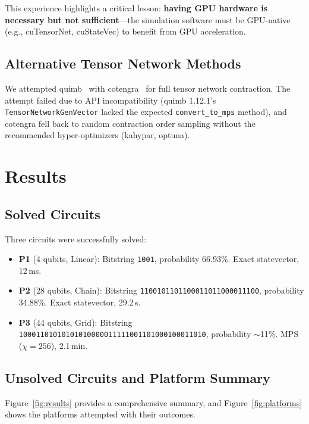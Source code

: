 \documentclass[11pt,a4paper]{article}
\newcommand{\bd}{\chi}
\begin{document}
This experience highlights a critical lesson: \textbf{having GPU hardware is necessary but not sufficient}---the simulation software must be GPU-native (e.g., cuTensorNet, cuStateVec) to benefit from GPU acceleration.

\subsection{Alternative Tensor Network Methods}
\label{sec:quimb}

We attempted quimb~\cite{gray2018quimb} with cotengra~\cite{gray2021hyper} for full tensor network contraction. The attempt failed due to API incompatibility (quimb 1.12.1's \texttt{TensorNetworkGenVector} lacked the expected \texttt{convert\_to\_mps} method), and cotengra fell back to random contraction order sampling without the recommended hyper-optimizers (kahypar, optuna).

\section{Results}
\label{sec:results}

\subsection{Solved Circuits}

Three circuits were successfully solved:
\begin{itemize}[nosep]
    \item \textbf{P1} (4 qubits, Linear): Bitstring \texttt{1001}, probability 66.93\%. Exact statevector, 12\,ms.
    \item \textbf{P2} (28 qubits, Chain): Bitstring \texttt{1100101101100011011000011100}, probability 34.88\%. Exact statevector, 29.2\,s.
    \item \textbf{P3} (44 qubits, Grid): Bitstring \texttt{10001101010101010000011111001101000100011010}, probability $\sim$11\%. MPS ($\bd = 256$), 2.1\,min.
\end{itemize}

\subsection{Unsolved Circuits and Platform Summary}

Figure~\ref{fig:results} provides a comprehensive summary, and Figure~\ref{fig:platforms} shows the platforms attempted with their outcomes.
\end{document}
